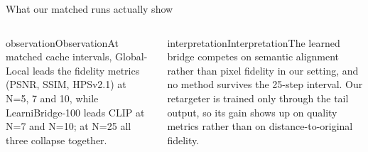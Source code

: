 \begin{frame}{What our matched runs actually show}
\begin{columns}[T]
\begin{wrsband}{observation}{Observation}At matched cache intervals, Global-Local leads the fidelity metrics (PSNR, SSIM, HPSv2.1) at N=5, 7 and 10, while LearniBridge-100 leads CLIP at N=7 and N=10; at N=25 all three collapse together.\end{wrsband}
\begin{wrsband}{interpretation}{Interpretation}The learned bridge competes on semantic alignment rather than pixel fidelity in our setting, and no method survives the 25-step interval. Our retargeter is trained only through the tail output, so its gain shows up on quality metrics rather than on distance-to-original fidelity.\end{wrsband}
\quad{}
\end{columns}
\end{frame}

